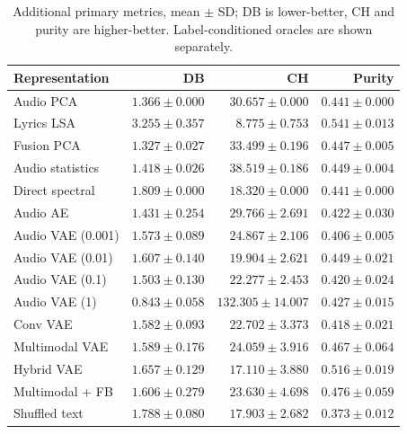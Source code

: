 \begin{table}[htbp]
\centering
\caption{Additional primary metrics, mean $\pm$ SD; DB is lower-better, CH and purity are higher-better. Label-conditioned oracles are shown separately.}
\label{tab:full}
\small
\begin{tabular}{lrrr}
\toprule
Representation & DB & CH & Purity \\
\midrule
Audio PCA & $1.366\pm0.000$ & $30.657\pm0.000$ & $0.441\pm0.000$ \\
Lyrics LSA & $3.255\pm0.357$ & $8.775\pm0.753$ & $0.541\pm0.013$ \\
Fusion PCA & $1.327\pm0.027$ & $33.499\pm0.196$ & $0.447\pm0.005$ \\
Audio statistics & $1.418\pm0.026$ & $38.519\pm0.186$ & $0.449\pm0.004$ \\
Direct spectral & $1.809\pm0.000$ & $18.320\pm0.000$ & $0.441\pm0.000$ \\
Audio AE & $1.431\pm0.254$ & $29.766\pm2.691$ & $0.422\pm0.030$ \\
Audio VAE (0.001) & $1.573\pm0.089$ & $24.867\pm2.106$ & $0.406\pm0.005$ \\
Audio VAE (0.01) & $1.607\pm0.140$ & $19.904\pm2.621$ & $0.449\pm0.021$ \\
Audio VAE (0.1) & $1.503\pm0.130$ & $22.277\pm2.453$ & $0.420\pm0.024$ \\
Audio VAE (1) & $0.843\pm0.058$ & $132.305\pm14.007$ & $0.427\pm0.015$ \\
Conv VAE & $1.582\pm0.093$ & $22.702\pm3.373$ & $0.418\pm0.021$ \\
Multimodal VAE & $1.589\pm0.176$ & $24.059\pm3.916$ & $0.467\pm0.064$ \\
Hybrid VAE & $1.657\pm0.129$ & $17.110\pm3.880$ & $0.516\pm0.019$ \\
Multimodal + FB & $1.606\pm0.279$ & $23.630\pm4.698$ & $0.476\pm0.059$ \\
Shuffled text & $1.788\pm0.080$ & $17.903\pm2.682$ & $0.373\pm0.012$ \\
\bottomrule
\end{tabular}
\end{table}
